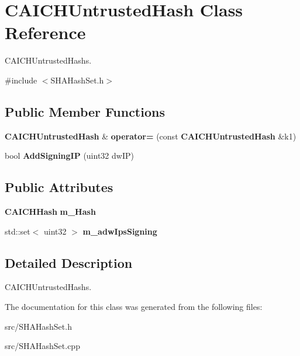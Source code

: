 \section{CAICHUntrustedHash Class Reference}
\label{classCAICHUntrustedHash}


CAICHUntrustedHashs.  


{\ttfamily \#include $<$SHAHashSet.h$>$}\subsection*{Public Member Functions}
\begin{DoxyCompactItemize}
\item 
{\bf CAICHUntrustedHash} \& {\bfseries operator=} (const {\bf CAICHUntrustedHash} \&k1)\label{classCAICHUntrustedHash_a14a2b2a85b974a1ad56258dd6baea8e3}

\item 
bool {\bf AddSigningIP} (uint32 dwIP)\label{classCAICHUntrustedHash_a9d9e7fa42e2378934114360ede5c35e8}

\end{DoxyCompactItemize}
\subsection*{Public Attributes}
\begin{DoxyCompactItemize}
\item 
{\bf CAICHHash} {\bfseries m\_\-Hash}\label{classCAICHUntrustedHash_aef2d6612c37b6da973f682104b082b73}

\item 
std::set$<$ uint32 $>$ {\bfseries m\_\-adwIpsSigning}\label{classCAICHUntrustedHash_af3634869bb0b54b6f62571a82a381e65}

\end{DoxyCompactItemize}


\subsection{Detailed Description}
CAICHUntrustedHashs. 

The documentation for this class was generated from the following files:\begin{DoxyCompactItemize}
\item 
src/SHAHashSet.h\item 
src/SHAHashSet.cpp\end{DoxyCompactItemize}

